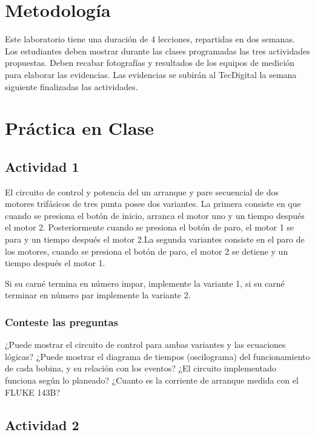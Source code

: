 \section{Metodología}

Este laboratorio tiene una duración de 4 lecciones, repartidas en dos semanas. Los estudiantes deben mostrar durante las clases programadas las tres actividades propuestas. Deben recabar fotografías y resultados de los equipos de medición para elaborar las evidencias. Las evidencias se subirán al TecDigital la semana siguiente finalizadas las actividades.

\section{Práctica en Clase}

\subsection{Actividad 1}

El circuito de control y potencia del un arranque y pare secuencial de dos motores trifásicos de tres punta posee dos variantes.  La primera consiste en que cuando se presiona el botón de inicio, arranca el motor uno y un tiempo después el motor 2. Posteriormente cuando se presiona el botón de paro, el motor 1 se para y un tiempo después el motor 2.La segunda variantes consiste en el paro de los motores, cuando se presiona el botón de paro, el motor 2 se detiene y un tiempo después el motor 1.  

Si su carné termina en número impar, implemente la variante 1, si su carné terminar en número par implemente la variante 2.
 
\subsubsection{Conteste las preguntas}

¿Puede mostrar el circuito de control para ambas variantes y las ecuaciones lógicas?
¿Puede mostrar el diagrama de tiempos (oscilograma) del funcionamiento de cada bobina, y su relación con los eventos?
¿El circuito implementado funciona según lo planeado? ¿Cuanto es la corriente de arranque medida con el FLUKE 143B?

\subsection{Actividad 2}
 

